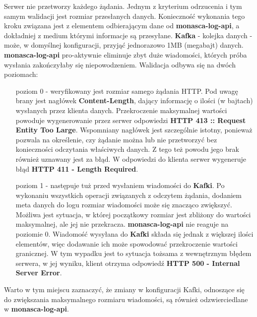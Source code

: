     Serwer nie przetworzy każdego żądania. Jednym z kryterium odrzucenia i
    tym samym walidacji jest rozmiar przesłanych danych. Konieczność wykonania tego kroku 
    związana jest z elementem odbierającym dane od \textbf{monasca-log-api}, a dokładniej z medium
    którymi informacje są przesyłane. \textbf{Kafka} - kolejka danych - może, w domyślnej konfiguracji,
    przyjąć jednorazowo 1MB (megabajt) danych. \textbf{monasca-log-api} pro-aktywnie eliminuje zbyt duże
    wiadomości, których próba wysłania zakończyłaby się niepowodzeniem. Walidacja odbywa się na dwóch poziomach:
    \begin{itemize}
        \item[poziom 0] - weryfikowany jest rozmiar samego żądania HTTP. Pod uwagę brany jest nagłówek
        \textbf{Content-Length}, dający informację o ilości (w bajtach) wysłanych przez klienta danych.
        Przekroczenie maksymalnej wartości powoduje wygenerowanie przez serwer odpowiedzi 
        \textbf{HTTP 413 :: Request Entity Too Large}. Wspomniany nagłówek jest szczególnie istotny,
        ponieważ pozwala na określenie, czy żądanie można lub nie przetworzyć bez konieczności
        odczytania właściwych danych. Z tego też powodu jego brak również uznawany jest za błąd.
        W odpowiedzi do klienta serwer wygeneruje błąd \textbf{HTTP 411 - Length Required}.
        \item[poziom 1] - następuje tuż przed wysłaniem wiadomości do \textbf{Kafki}. Po wykonaniu wszystkich
        operacji związanych z odczytem żądania, dodaniem meta danych do logu rozmiar wiadomości może się
        znacząco zwiększyć. Możliwa jest sytuacja, w której początkowy rozmiar jest zbliżony do 
        wartości maksymalnej, ale jej nie przekracza. \textbf{monasca-log-api} nie reaguje na poziomie 0. Wiadomość wysyłana do \textbf{Kafki} składa się jednak z większej ilości elementów,
        więc dodawanie ich może spowodować przekroczenie wartości granicznej. W tym wypadku jest to sytuacja
        tożsama z wewnętrznym błędem serwera, w jej wyniku, klient otrzyma odpowiedź
        \textbf{HTTP 500 - Internal Server Error}.
    \end{itemize}
    
    Warto w tym miejscu zaznaczyć, że zmiany w konfiguracji Kafki, odnoszące się do zwiększania
    maksymalnego rozmiaru wiadomości, są również odzwierciedlane w \textbf{monasca-log-api}. 
    

